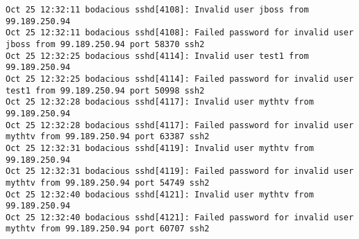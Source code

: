 \begin{verbatim}
Oct 25 12:32:11 bodacious sshd[4108]: Invalid user jboss from 99.189.250.94
Oct 25 12:32:11 bodacious sshd[4108]: Failed password for invalid user jboss from 99.189.250.94 port 58370 ssh2
Oct 25 12:32:25 bodacious sshd[4114]: Invalid user test1 from 99.189.250.94
Oct 25 12:32:25 bodacious sshd[4114]: Failed password for invalid user test1 from 99.189.250.94 port 50998 ssh2
Oct 25 12:32:28 bodacious sshd[4117]: Invalid user mythtv from 99.189.250.94
Oct 25 12:32:28 bodacious sshd[4117]: Failed password for invalid user mythtv from 99.189.250.94 port 63387 ssh2
Oct 25 12:32:31 bodacious sshd[4119]: Invalid user mythtv from 99.189.250.94
Oct 25 12:32:31 bodacious sshd[4119]: Failed password for invalid user mythtv from 99.189.250.94 port 54749 ssh2
Oct 25 12:32:40 bodacious sshd[4121]: Invalid user mythtv from 99.189.250.94
Oct 25 12:32:40 bodacious sshd[4121]: Failed password for invalid user mythtv from 99.189.250.94 port 60707 ssh2
\end{verbatim}
\normalsize